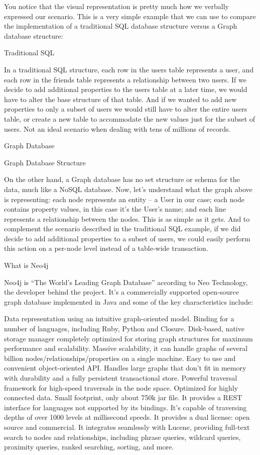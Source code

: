\documentclass[10pt, conference, compsocconf]{IEEEtran}
\begin{document}
You notice that the visual representation is pretty much how we verbally expressed our scenario. This is a very simple example that we can use to compare the implementation of a traditional SQL database structure versus a Graph database structure:

Traditional SQL



In a traditional SQL structure, each row in the users table represents a user, and each row in the friends table represents a relationship between two users. If we decide to add additional properties to the users table at a later time, we would have to alter the base structure of that table. And if we wanted to add new properties to only a subset of users we would still have to alter the entire users table, or create a new table to accommodate the new values just for the subset of users. Not an ideal scenario when dealing with tens of millions of records.

Graph Database

Graph Database Structure

On the other hand, a Graph database has no set structure or schema for the data, much like a NoSQL database. Now, let’s understand what the graph above is representing: each node represents an entity – a User in our case; each node contains property values, in this case it’s the User’s name; and each line represents a relationship between the nodes. This is as simple as it gets. And to complement the scenario described in the traditional SQL example, if we did decide to add additional properties to a subset of users, we could easily perform this action on a per-node level instead of a table-wide transaction.


What is Neo4j

Neo4j is “The World’s Leading Graph Database” according to Neo Technology, the developer behind the project. It’s a commercially supported open-source graph database implemented in Java and some of the key characteristics include:

Data representation using an intuitive graph-oriented model.
Binding for a number of languages, including Ruby, Python and Closure.
Disk-based, native storage manager completely optimized for storing graph structures for maximum performance and scalability.
Massive scalability, it can handle graphs of several billion nodes/relationships/properties on a single machine.
Easy to use and convenient object-oriented API.
Handles large graphs that don’t fit in memory with durability and a fully persistent transactional store.
Powerful traversal framework for high-speed traversals in the node space.
Optimized for highly connected data.
Small footprint, only about 750k jar file.
It provides a REST interface for languages not supported by its bindings.
It’s capable of traversing depths of over 1000 levels at millisecond speeds.
It provides a dual license: open source and commercial.
It integrates seamlessly with Lucene, providing full-text search to nodes and relationships, including phrase queries, wildcard queries, proximity queries, ranked searching, sorting, and more.
\end{document}
